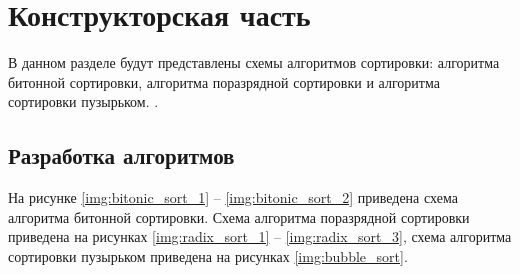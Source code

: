\chapter{Конструкторская часть}

В данном разделе будут представлены схемы алгоритмов сортировки: алгоритма битонной сортировки, алгоритма поразрядной сортировки и алгоритма сортировки пузырьком.
. 
\section{Разработка алгоритмов}

На рисунке \ref{img:bitonic_sort_1} -- \ref{img:bitonic_sort_2} приведена схема алгоритма битонной сортировки. 
Схема алгоритма поразрядной сортировки приведена на рисунках \ref{img:radix_sort_1} -- \ref{img:radix_sort_3}, схема алгоритма сортировки пузырьком приведена на рисунках \ref{img:bubble_sort}.


